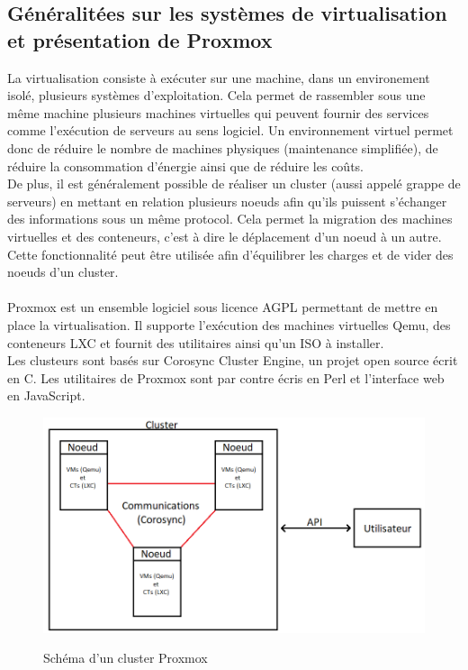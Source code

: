 \documentclass[14pt]{extarticle}
\begin{document}
    \subsection{Généralitées sur les systèmes de virtualisation et présentation de Proxmox}
    La virtualisation consiste à exécuter sur une machine, dans un environement isolé, plusieurs systèmes d'exploitation. Cela permet de rassembler sous une même machine plusieurs machines virtuelles qui peuvent fournir des services comme l'exécution de serveurs au sens logiciel. Un environnement virtuel permet donc de réduire le nombre de machines physiques (maintenance simplifiée), de réduire la consommation d'énergie ainsi que de réduire les coûts.\\
    De plus, il est généralement possible de réaliser un cluster (aussi appelé grappe de serveurs) en mettant en relation plusieurs noeuds afin qu'ils puissent s'échanger des informations sous un même protocol. Cela permet la migration des machines virtuelles et des conteneurs, c'est à dire le déplacement d'un noeud à un autre. Cette fonctionnalité peut être utilisée afin d'équilibrer les charges et de vider des noeuds d'un cluster.\\
    \\
    Proxmox \cite{pve} est un ensemble logiciel sous licence AGPL permettant de mettre en place la virtualisation. Il supporte l'exécution des machines virtuelles Qemu, des conteneurs LXC et fournit des utilitaires ainsi qu'un ISO à installer.\\
    Les clusteurs sont basés sur Corosync Cluster Engine, un projet open source écrit en C. Les utilitaires de Proxmox sont par contre écris en Perl et l'interface web en JavaScript.
    \newpage
    \begin{figure}[!h]
       \centering
        \includegraphics[width=1\textwidth]{img/cluster.png}
        \label{Schéma d'un cluster Proxmox}
        \caption{Schéma d'un cluster Proxmox}
    \end{figure}
\end{document}
